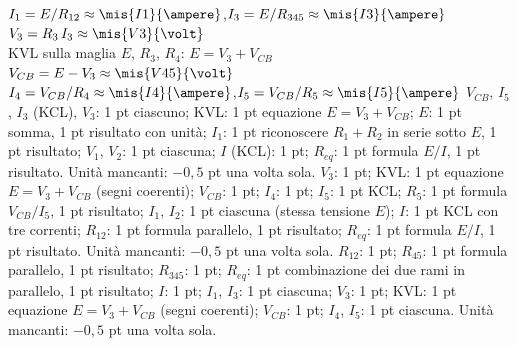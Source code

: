 \begin{esercizio}[14]
\begin{solution}
{  $I_1 = E/R_{12} \approx \mis{I1}{\ampere}$,\qquad $I_3 = E/R_{345} \approx \mis{I3}{\ampere}$\\[4pt]
  $V_3 = R_3\,I_3 \approx \mis{V3}{\volt}$\\[4pt]
  KVL sulla maglia $E$, $R_3$, $R_4$: $E = V_3 + V_{CB}$\\[2pt]
  $V_{CB} = E - V_3 \approx \mis{V45}{\volt}$\\[4pt]
  $I_4 = V_{CB}/R_4 \approx \mis{I4}{\ampere}$,\qquad $I_5 = V_{CB}/R_5 \approx \mis{I5}{\ampere}$}
  \criterioABC
  {$V_{CB}$, $I_5$, $I_3$ (KCL), $V_3$: 1 pt ciascuno; KVL: 1 pt equazione $E=V_3+V_{CB}$; $E$: 1 pt
    somma, 1 pt risultato con unità; $I_1$: 1 pt riconoscere $R_1+R_2$ in serie sotto $E$, 1 pt
    risultato; $V_1$, $V_2$: 1 pt ciascuna; $I$ (KCL): 1 pt; $R_{eq}$: 1 pt formula $E/I$, 1 pt
    risultato. Unità mancanti: $-0{,}5$ pt una volta sola.}
  {$V_3$: 1 pt; KVL: 1 pt equazione $E=V_3+V_{CB}$ (segni coerenti); $V_{CB}$: 1 pt; $I_4$: 1 pt;
    $I_5$: 1 pt KCL; $R_5$: 1 pt formula $V_{CB}/I_5$, 1 pt risultato; $I_1$, $I_2$: 1 pt ciascuna
    (stessa tensione $E$); $I$: 1 pt KCL con tre correnti; $R_{12}$: 1 pt formula parallelo, 1 pt
    risultato; $R_{eq}$: 1 pt formula $E/I$, 1 pt risultato. Unità mancanti: $-0{,}5$ pt una volta sola.}
  {$R_{12}$: 1 pt; $R_{45}$: 1 pt formula parallelo, 1 pt risultato; $R_{345}$: 1 pt; $R_{eq}$: 1 pt
    combinazione dei due rami in parallelo, 1 pt risultato; $I$: 1 pt; $I_1$, $I_3$: 1 pt ciascuna;
    $V_3$: 1 pt; KVL: 1 pt equazione $E=V_3+V_{CB}$ (segni coerenti); $V_{CB}$: 1 pt; $I_4$, $I_5$: 1 pt
    ciascuna. Unità mancanti: $-0{,}5$ pt una volta sola.}
\end{solution}
\end{esercizio}

